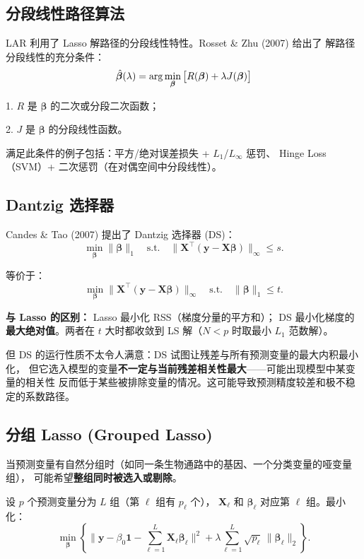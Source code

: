\subsection{分段线性路径算法}

LAR 利用了 Lasso 解路径的分段线性特性。Rosset \& Zhu (2007) 给出了
解路径分段线性的充分条件：
\[
    \hat{\bm{\beta}}(\lambda) = \arg\min_{\bm{\beta}} \big[R(\bm{\beta}) + \lambda J(\bm{\beta})\big]
\]

1. $R$ 是 $\bm{\beta}$ 的二次或分段二次函数；

2. $J$ 是 $\bm{\beta}$ 的分段线性函数。

满足此条件的例子包括：平方/绝对误差损失 + $L_1$/$L_\infty$ 惩罚、
Hinge Loss（SVM）+ 二次惩罚（在对偶空间中分段线性）。

\subsection{Dantzig 选择器}

Candes \& Tao (2007) 提出了 Dantzig 选择器 (DS)：
\begin{equation}\label{eq:ds}
    \min_{\bm{\beta}} \|\bm{\beta}\|_1
    \quad \text{s.t.} \quad
    \big\|\mathbf{X}^\top (\mathbf{y} - \mathbf{X}\bm{\beta})\big\|_\infty \le s.
\end{equation}

等价于：
\[
    \min_{\bm{\beta}} \big\|\mathbf{X}^\top (\mathbf{y} - \mathbf{X}\bm{\beta})\big\|_\infty
    \quad \text{s.t.} \quad \|\bm{\beta}\|_1 \le t.
\]

\textbf{与 Lasso 的区别：} Lasso 最小化 RSS（梯度分量的平方和）；
DS 最小化梯度的\textbf{最大绝对值}。两者在 $t$ 大时都收敛到 LS 解（$N<p$ 时取最小 $L_1$ 范数解）。

但 DS 的运行性质不太令人满意：DS 试图让残差与所有预测变量的最大内积最小化，
但它选入模型的变量\textbf{不一定与当前残差相关性最大}——可能出现模型中某变量的相关性
反而低于某些被排除变量的情况。这可能导致预测精度较差和极不稳定的系数路径。

\subsection{分组 Lasso (Grouped Lasso)}

当预测变量有自然分组时（如同一条生物通路中的基因、一个分类变量的哑变量组），
可能希望\textbf{整组同时被选入或剔除}。

\begin{definition}[分组 Lasso]
设 $p$ 个预测变量分为 $L$ 组（第 $\ell$ 组有 $p_\ell$ 个），
$\mathbf{X}_\ell$ 和 $\bm{\beta}_\ell$ 对应第 $\ell$ 组。最小化：
\begin{equation}\label{eq:group_lasso}
    \min_{\bm{\beta}} \left\{
        \Big\|\mathbf{y} - \beta_0\mathbf{1} - \sum_{\ell=1}^{L} \mathbf{X}_\ell \bm{\beta}_\ell\Big\|^2
        + \lambda \sum_{\ell=1}^{L} \sqrt{p_\ell}\, \|\bm{\beta}_\ell\|_2
    \right\}.
\end{equation}
\end{definition}

